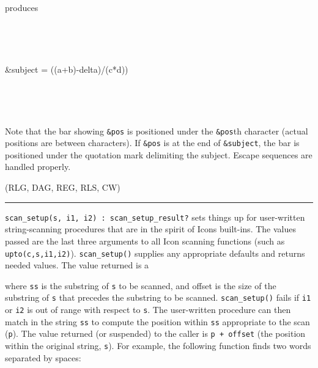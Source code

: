 produces


{\ttfamily
{\textbar}
\ \ \ \ \ \ \ \ \ \ \ \ \ \ \ \ \ \ \ \ \ \ \ \ \ \ \ \ \ \ \ \ \ \ {\textbar}}

{\ttfamily
{\textbar}
\ \ \ \ \ \ \ \ \ \ \ \ \ \ \ \ \ \ \ \ \ \ \ \ \ \ \ \ \ \ \ \ \ \ {\textbar}}

{\ttfamily
{\textbar} \&subject =
{\textquotedbl}((a+b)-delta)/(c*d)){\textquotedbl} {\textbar}}

{\ttfamily
{\textbar} \ \ \ \ \ \ \ \ \ \ \ \ \ \ \ \ \ \ \ \ \ \ \ \ \ {\textbar}
\ \ \ \ \ \ \ {\textbar}}

{\ttfamily
{\textbar}
\ \ \ \ \ \ \ \ \ \ \ \ \ \ \ \ \ \ \ \ \ \ \ \ \ \ \ \ \ \ \ \ \ \ {\textbar}}

\iconcode{
{}-{}-{}-{}-{}-{}-{}-{}-{}-{}-{}-{}-{}-{}-{}-{}-{}-{}-{}-{}-{}-{}-{}-{}-{}-{}-{}-{}-{}-{}-{}-{}-{}-{}-{}-{}-{}-}

Note that the bar showing \texttt{\&pos} is positioned under the
\texttt{\&pos{\textquotesingle}}th character (actual positions are
between characters). If \texttt{\&pos} is at the end of
\texttt{\&subject}, the bar is positioned under the quotation mark
delimiting the subject. Escape sequences are handled properly. 

(RLG, DAG, REG, RLS, CW)

\vspace{0.25cm}\hrule{}

\texttt{scan\_setup(s, i1, i2) : scan\_setup\_result?} sets things up
for user-written string-scanning procedures that are in the spirit of
Icon{\textquotesingle}s built-ins. The values passed are the last three
arguments to all Icon scanning functions (such as
\texttt{upto(c,s,i1,i2)}). \texttt{scan\_setup()} supplies any
appropriate defaults and returns needed values. The value returned is a


where \texttt{ss} is the substring of \texttt{s} to be scanned, and
offset is the size of the substring of \texttt{s} that precedes the
substring to be scanned. \texttt{scan\_setup()} fails if \texttt{i1} or
\texttt{i2} is out of range with respect to \texttt{s}. The
user-written procedure can then match in the string \texttt{ss} to
compute the position within \texttt{ss} appropriate to the scan
(\texttt{p}). The value returned (or suspended) to the caller is
\texttt{p + offset} (the position within the original string,
\texttt{s}). For example, the following function finds two words
separated by spaces:

